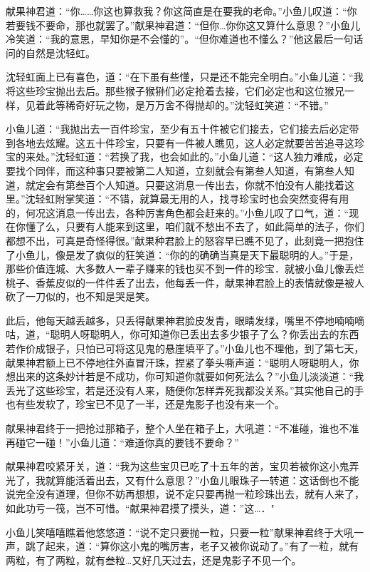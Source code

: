 \documentclass[12pt,oneside]{book}
\begin{document}
献果神君道：``你\ldots\ldots 你这也算救我？你这简直是在要我的老命。''小鱼儿叹道：``你若要钱不要命，那也就罢了。''献果神君道：``但你\ldots 你你这又算什么意思？''小鱼儿冷笑道：``我的意思，早知你是不会懂的''。``但你难道也不懂么？''他这最后一句话问的自然是沈轻虹。

沈轻虹面上已有喜色，道：``在下虽有些懂，只是还不能完全明白。''小鱼儿道：``我将这些珍宝抛出去后。那些猴子猴狲们必定抢着去接，它们必定也和这位猴兄一样，见着此等稀奇好玩之物，是万万舍不得抛却的。''沈轻虹笑道：``不错。''

小鱼儿道：``我抛出去一百件珍宝，至少有五十件被它们接去，它们接去后必定带到各地去炫耀。这五十件珍宝，只要有一件被人瞧见，这人必定就要苦苦追寻这珍宝的来处。''沈轻虹道：``若换了我，也会如此的。''小鱼儿道：``这人独力难成，必定要找个同伴，而这种事只要被第二人知道，立刻就会有第叁人知道，有第叁人知道，就定会有第叁百个人知道。只要这消息一传出去，你就不怕没有人能找着这里。''沈轻虹附掌笑道：``不错，就算最无用的人，找寻珍宝时也会突然变得有用的，何况这消息一传出去，各种厉害角色都会赶来的。''小鱼儿叹了口气，道：``现在你懂了么，只要有人能来到这里，咱们就不愁出不去了，如此简单的法子，你们都想不出，可真是奇怪得很。''献果种君脸上的怒容早已瞧不见了，此刻竟一把抱住了小鱼儿，像是发了疯似的狂笑道：``你的的确确当真是天下最聪明的人。''于是，那些价值连城、大多数人一辈子赚来的钱也买不到一件的珍宝．就被小鱼儿像丢烂桃子、香蕉皮似的一件件丢了出去，他每丢一件，献果神君脸上的表情就像是被人砍了一刀似的，也不知是哭是笑。

此后，他每天越丢越多，只丢得献果神君脸皮发青，眼睛发绿，嘴里不停地喃喃嘀咕，道，``聪明人呀聪明人，你可知道你已丢出去多少银子了么？你丢出去的东西若作价成银子，只怕已可将这见鬼的悬崖填平了。''小鱼儿也不理他，到了第七天，献果神君额上已不停地往外直冒汗珠，捏紧了拳头嘶声道：``聪明人呀聪明人，你想出来的这条妙计若是不成功，你可知道你就要如何死法么？''小鱼儿淡淡道：``我丢光了这些珍宝，若是还没有人来，随便你怎样弄死我都没关系。''其实他自己的手也有些发软了，珍宝已不见了一半，还是鬼影子也没有来一个。

献果神君终于一把抢过那箱子，整个人坐在箱子上，大吼道：``不准碰，谁也不准再碰它一碰！''小鱼儿道：``难道你真的要钱不要命？''

献果神君咬紧牙关，道：``我为这些宝贝已吃了十五年的苦，宝贝若被你这小鬼弄光了，我就算能活着出去，又有什么意思？''小鱼儿眼珠子一转道：这话倒也不能说完全没有道理，但你不妨再想想，说不定只要再抛一粒珍珠出去，就有人来了，如此功亏一筏，岂不可惜。``献果神君摸了摸头，道：''这\ldots．"

小鱼儿笑嘻嘻瞧着他悠悠道：``说不定只要抛一粒，只要一粒''献果神君终于大吼一声，跳了起来，道：``算你这小鬼的嘴厉害，老子又被你说动了。''有了一粒，就有两粒，有了两粒，就有叁粒\ldots 又好几天过去，还是鬼影子不见一个。
\end{document}
